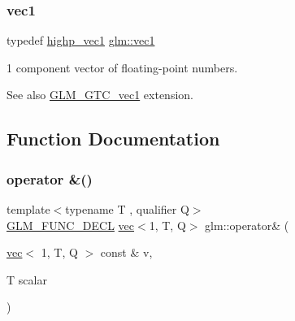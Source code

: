 \subsubsection{\texorpdfstring{vec1}{vec1}}
{\footnotesize\ttfamily typedef \mbox{\hyperlink{group__ext__vec1_gad8ebf6f2ad36cc3167e77f82b4ae9390}{highp\+\_\+vec1}} \mbox{\hyperlink{group__ext__vec1_ga16030dae9029ed1eab1553a2183bbb79}{glm\+::vec1}}}

1 component vector of floating-\/point numbers. \begin{DoxySeeAlso}{See also}
\mbox{\hyperlink{group__gtc__vec1}{G\+L\+M\+\_\+\+G\+T\+C\+\_\+vec1}} extension. 
\end{DoxySeeAlso}


\subsection{Function Documentation}
\mbox{\label{group__ext__vec1_ga62a75b0dadc3e908b03bf03bee891e6d}} 
\subsubsection{\texorpdfstring{operator \&()}{operator \&()}\hspace{0.1cm}{\footnotesize\ttfamily [1/3]}}
{\footnotesize\ttfamily template$<$typename T , qualifier Q$>$ \\
\mbox{\hyperlink{setup_8hpp_ab2d052de21a70539923e9bcbf6e83a51}{G\+L\+M\+\_\+\+F\+U\+N\+C\+\_\+\+D\+E\+CL}} \mbox{\hyperlink{structglm_1_1vec}{vec}}$<$1, T, Q$>$ glm\+::operator\& (\begin{DoxyParamCaption}\item[{\mbox{\hyperlink{structglm_1_1vec}{vec}}$<$ 1, T, Q $>$ const \&}]{v,  }\item[{T}]{scalar }\end{DoxyParamCaption})}

\mbox{\label{group__ext__vec1_ga6637b42fbf149b977ce3f66571be212a}} 

